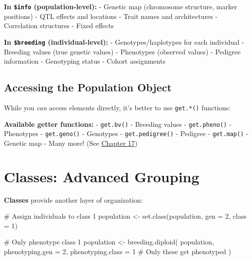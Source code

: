 \documentclass[
  letterpaper,
]{book}
\newenvironment{Shaded}{\begin{snugshade}}{\end{snugshade}}
\newcommand{\AttributeTok}[1]{\textcolor[rgb]{0.40,0.45,0.13}{#1}}
\newcommand{\CommentTok}[1]{\textcolor[rgb]{0.37,0.37,0.37}{#1}}
\newcommand{\DecValTok}[1]{\textcolor[rgb]{0.68,0.00,0.00}{#1}}
\newcommand{\FunctionTok}[1]{\textcolor[rgb]{0.28,0.35,0.67}{#1}}
\newcommand{\NormalTok}[1]{\textcolor[rgb]{0.00,0.23,0.31}{#1}}
\newcommand{\OtherTok}[1]{\textcolor[rgb]{0.00,0.23,0.31}{#1}}
\newcommand{\SpecialCharTok}[1]{\textcolor[rgb]{0.37,0.37,0.37}{#1}}
\begin{document}
\textbf{In \texttt{\$info} (population-level):} - Genetic map
(chromosome structure, marker positions) - QTL effects and locations -
Trait names and architectures - Correlation structures - Fixed effects

\textbf{In \texttt{\$breeding} (individual-level):} -
Genotypes/haplotypes for each individual - Breeding values (true genetic
values) - Phenotypes (observed values) - Pedigree information -
Genotyping status - Cohort assignments

\subsection{Accessing the Population
Object}\label{accessing-the-population-object}

While you \emph{can} access elements directly, it's better to use
\texttt{get.*()} functions:

\begin{Shaded}
\end{Shaded}

\textbf{Available getter functions:} - \texttt{get.bv()} - Breeding
values - \texttt{get.pheno()} - Phenotypes - \texttt{get.geno()} -
Genotypes - \texttt{get.pedigree()} - Pedigree - \texttt{get.map()} -
Genetic map - Many more! (See \hyperref[sec-function-reference]{Chapter
17})

\section{Classes: Advanced Grouping}\label{sec-classes}

\textbf{Classes} provide another layer of organization:

\begin{Shaded}
\begin{Highlighting}[]
\CommentTok{\# Assign individuals to class 1}
\NormalTok{population }\OtherTok{\textless{}{-}} \FunctionTok{set.class}\NormalTok{(population,}
                        \AttributeTok{gen =} \DecValTok{2}\NormalTok{,}
                        \AttributeTok{class =} \DecValTok{1}\NormalTok{)}

\CommentTok{\# Only phenotype class 1}
\NormalTok{population }\OtherTok{\textless{}{-}} \FunctionTok{breeding.diploid}\NormalTok{(}
\NormalTok{  population,}
  \AttributeTok{phenotyping.gen =} \DecValTok{2}\NormalTok{,}
  \AttributeTok{phenotyping.class =} \DecValTok{1}  \CommentTok{\# Only these get phenotyped}
\NormalTok{)}
\end{Highlighting}
\end{Shaded}
\end{document}
